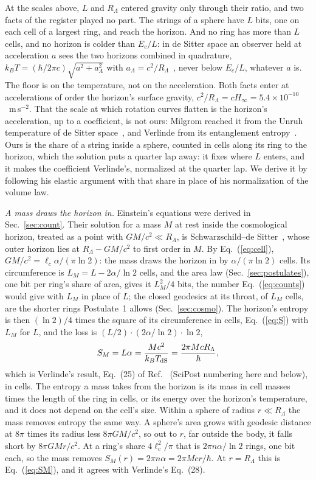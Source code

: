 \documentclass[aps,prd,twocolumn,superscriptaddress,nofootinbib,showkeys]{revtex4-2}
\newcommand{\lc}{\ell_c}
\newcommand{\Ec}{E_c}
\newcommand{\RL}{R_\Lambda}
\begin{document}
At the scales above, $L$ and $\RL$ entered gravity only through their ratio, and two facts of the register played no part. The strings of a sphere have $L$ bits, one on each cell of a largest ring, and reach the horizon. And no ring has more than $L$ cells, and no horizon is colder than $\Ec/L$: in de Sitter space an observer held at acceleration $a$ sees the two horizons combined in quadrature, $k_BT = (\hbar/2\pi c)\sqrt{a^2 + a_\Lambda^2}$ with $a_\Lambda = c^2/\RL$~\cite{deser1997}, never below $\Ec/L$, whatever $a$ is. The floor is on the temperature, not on the acceleration. Both facts enter at accelerations of order the horizon's surface gravity, $c^2/\RL = cH_\infty = 5.4\times10^{-10}$~m\,s$^{-2}$. That the scale at which rotation curves flatten is the horizon's acceleration, up to a coefficient, is not ours: Milgrom reached it from the Unruh temperature of de Sitter space~\cite{milgrom1999}, and Verlinde from its entanglement entropy~\cite{verlinde2017}. Ours is the share of a string inside a sphere, counted in cells along its ring to the horizon, which the solution puts a quarter lap away: it fixes where $L$ enters, and it makes the coefficient Verlinde's, normalized at the quarter lap. We derive it by following his elastic argument with that share in place of his normalization of the volume law.

\textit{A mass draws the horizon in.} Einstein's equations were derived in Sec.~\ref{sec:count}. Their solution for a mass $M$ at rest inside the cosmological horizon, treated as a point with $GM/c^2\ll\RL$, is Schwarzschild--de Sitter~\cite{kottler1918}, whose outer horizon lies at $\RL - GM/c^2$ to first order in $M$. By Eq.~(\ref{eq:cell}), $GM/c^2 = \lc\alpha/(\pi\ln2)$: the mass draws the horizon in by $\alpha/(\pi\ln2)$ cells. Its circumference is $L_M = L - 2\alpha/\ln2$ cells, and the area law (Sec.~\ref{sec:postulates}), one bit per ring's share of area, gives it $L_M^2/4$ bits, the number Eq.~(\ref{eq:counts}) would give with $L_M$ in place of $L$; the closed geodesics at its throat, of $L_M$ cells, are the shorter rings Postulate~1 allows (Sec.~\ref{sec:cosmo}). The horizon's entropy is then $(\ln2)/4$ times the square of its circumference in cells, Eq.~(\ref{eq:S}) with $L_M$ for $L$, and the loss is $(L/2)\cdot(2\alpha/\ln2)\cdot\ln2$,
\begin{equation}
S_M = L\alpha = \frac{Mc^2}{k_BT_{\rm dS}} = \frac{2\pi Mc\RL}{\hbar} ,
\label{eq:SM}
\end{equation}
which is Verlinde's result, Eq.~(25) of Ref.~\cite{verlinde2017} (SciPost numbering here and below), in cells. The entropy a mass takes from the horizon is its mass in cell masses times the length of the ring in cells, or its energy over the horizon's temperature, and it does not depend on the cell's size. Within a sphere of radius $r\ll\RL$ the mass removes entropy the same way. A sphere's area grows with geodesic distance at $8\pi$ times its radius less $8\pi GM/c^2$, so out to $r$, far outside the body, it falls short by $8\pi GMr/c^2$. At a ring's share $4\lc^2/\pi$ that is $2\pi n\alpha/\ln2$ rings, one bit each, so the mass removes $S_M(r) = 2\pi n\alpha = 2\pi Mcr/\hbar$. At $r = \RL$ this is Eq.~(\ref{eq:SM}), and it agrees with Verlinde's Eq.~(28).
\end{document}
